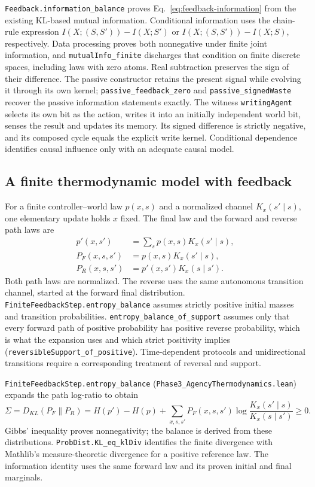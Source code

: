 \documentclass{article}
\begin{document}
\nolinkurl{Feedback.information_balance} proves Eq.~\eqref{eq:feedback-information} from the existing KL-based mutual information. Conditional information uses the chain-rule expression $I(X;(S,S'))-I(X;S')$ or $I(X;(S,S'))-I(X;S)$, respectively. Data processing proves both nonnegative under finite joint information, and \nolinkurl{mutualInfo_finite} discharges that condition on finite discrete spaces, including laws with zero atoms. Real subtraction preserves the sign of their difference. The passive constructor retains the present signal while evolving it through its own kernel; \nolinkurl{passive_feedback_zero} and \nolinkurl{passive_signedWaste} recover the passive information statements exactly. The witness \texttt{writingAgent} selects its own bit as the action, writes it into an initially independent world bit, senses the result and updates its memory. Its signed difference is strictly negative, and its composed cycle equals the explicit write kernel. Conditional dependence identifies causal influence only with an adequate causal model.

\subsection{A finite thermodynamic model with feedback}
\label{sec:supp-feedback-model}

For a finite controller--world law $p(x,s)$ and a normalized channel $K_x(s'\mid s)$, one elementary update holds $x$ fixed. The final law and the forward and reverse path laws are
\begin{align*}
 p'(x,s')&=\sum_s p(x,s)K_x(s'\mid s),\\
 P_F(x,s,s')&=p(x,s)K_x(s'\mid s),\\
 P_R(x,s,s')&=p'(x,s')K_x(s\mid s').
\end{align*}
Both path laws are normalized. The reverse uses the same autonomous transition channel, started at the forward final distribution. \nolinkurl{FiniteFeedbackStep.entropy_balance} assumes strictly positive initial masses and transition probabilities. \nolinkurl{entropy_balance_of_support} assumes only that every forward path of positive probability has positive reverse probability, which is what the expansion uses and which strict positivity implies (\nolinkurl{reversibleSupport_of_positive}). Time-dependent protocols and unidirectional transitions require a corresponding treatment of reversal and support.

\nolinkurl{FiniteFeedbackStep.entropy_balance}
(\nolinkurl{Phase3_AgencyThermodynamics.lean}) expands the path log-ratio to obtain
\begin{equation}
 \Sigma=D_{KL}(P_F\|P_R)
 =H(p')-H(p)+\sum_{x,s,s'}P_F(x,s,s')
       \log\frac{K_x(s'\mid s)}{K_x(s\mid s')}\ge0.
\end{equation}
Gibbs' inequality proves nonnegativity; the balance is derived from these distributions. \nolinkurl{ProbDist.KL_eq_klDiv} identifies the finite divergence with Mathlib's measure-theoretic divergence for a positive reference law. The information identity uses the same forward law and its proven initial and final marginals.
\end{document}
